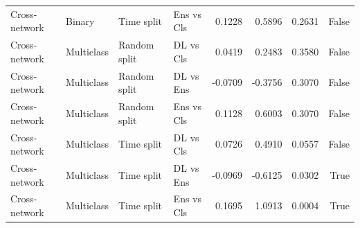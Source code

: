 \begin{table}
\begin{tabular}{llllrrrr}
Cross-network & Binary & Time split & Ens vs Cls & 0.1228 & 0.5896 & 0.2631 & False \\
Cross-network & Multiclass & Random split & DL vs Cls & 0.0419 & 0.2483 & 0.3580 & False \\
Cross-network & Multiclass & Random split & DL vs Ens & -0.0709 & -0.3756 & 0.3070 & False \\
Cross-network & Multiclass & Random split & Ens vs Cls & 0.1128 & 0.6003 & 0.3070 & False \\
Cross-network & Multiclass & Time split & DL vs Cls & 0.0726 & 0.4910 & 0.0557 & False \\
Cross-network & Multiclass & Time split & DL vs Ens & -0.0969 & -0.6125 & 0.0302 & True \\
Cross-network & Multiclass & Time split & Ens vs Cls & 0.1695 & 1.0913 & 0.0004 & True \\
\bottomrule
\end{tabular}
\end{table}
